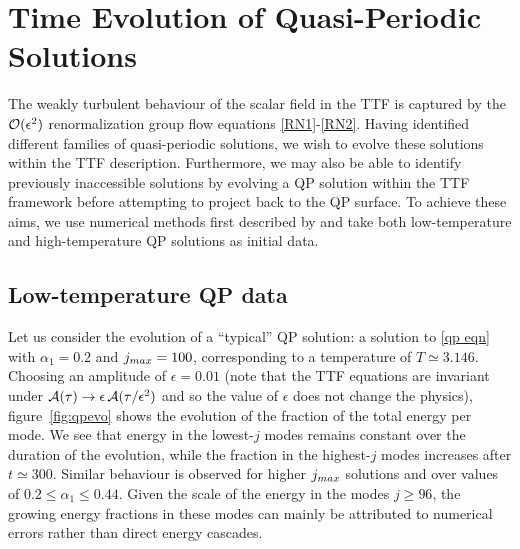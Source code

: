 \documentclass[../PhD.tex]{subfiles}
\begin{document}

\section{Time Evolution of Quasi-Periodic Solutions}
\label{sec: time evolution}

The weakly turbulent behaviour of the scalar field in the TTF is captured by the $\mathcal O(\epsilon^2)$ renormalization group flow equations {\eqref{RN1}-\eqref{RN2}}. Having identified different families of quasi-periodic solutions, we wish to evolve these solutions within the TTF description. Furthermore, we may also be able to identify previously inaccessible solutions by evolving a QP solution within the TTF framework before attempting to project back to the QP surface. To achieve these aims, we use numerical methods first described by \cite{1606.02712} and take both low-temperature and high-temperature QP solutions as initial data. 


\subsection{Low-temperature QP data}

Let us consider the evolution of a ``typical'' QP solution: a solution to \eqref{qp eqn} with $\alpha_1 = 0.2$ and $j_{max} = 100$, corresponding to a temperature of $T \simeq 3.146$. Choosing an amplitude of $\epsilon = 0.01$ (note that the TTF equations are invariant under $\mathcal A(\tau) \to \epsilon \, \mathcal A(\tau / \epsilon^2)$ and so the value of $\epsilon$ does not change the physics), figure~\ref{fig:qpevo} shows the evolution of the fraction of the total energy per mode. We see that energy in the lowest-$j$ modes remains constant over the duration of the evolution, while the fraction in the highest-$j$ modes increases after $t \simeq 300$. Similar behaviour is observed for higher $j_{max}$ solutions and over values of $0.2 \leq \alpha_1 \leq 0.44$. Given the scale of the energy in the modes $j \geq 96$, the growing energy fractions in these modes can mainly be attributed to numerical errors rather than direct energy cascades.
\end{document}
